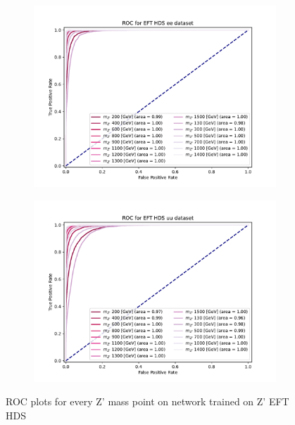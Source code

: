 \documentclass[12pt, a4paper]{book}
\begin{document}
\begin{figure}[!ht]
	\centering
	\begin{subfigure}[b]{0.49\textwidth}
      \centering
      \includegraphics[width=1\textwidth]{XGBoost/EFT_HDS/ROC_ee.pdf}
      \end{subfigure}
   \hfill
   \begin{subfigure}[b]{0.49\textwidth}
      \centering
      \includegraphics[width=1\textwidth]{XGBoost/EFT_HDS/ROC_uu.pdf}
      \end{subfigure}
   \caption{ROC plots for every Z' mass point on network trained on Z' EFT HDS}\label{fig:EFT_HDS_ROCS}
\end{figure}
\end{document}
